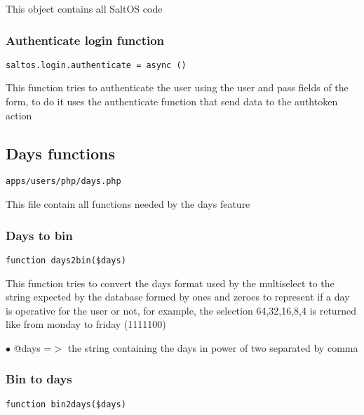 \documentclass[a4paper]{article}
\begin{document}
This object contains all SaltOS code

\hypertarget{toc167}{}
\subsubsection{Authenticate login function}

\begin{lstlisting}
saltos.login.authenticate = async ()
\end{lstlisting}

This function tries to authenticate the user using the user and pass fields of the form, to do
it uses the authenticate function that send data to the authtoken action

\hypertarget{toc168}{}
\subsection{Days functions}

\begin{lstlisting}
apps/users/php/days.php
\end{lstlisting}

This file contain all functions needed by the days feature

\hypertarget{toc169}{}
\subsubsection{Days to bin}

\begin{lstlisting}
function days2bin($days)
\end{lstlisting}

This function tries to convert the days format used by the multiselect
to the string expected by the database formed by ones and zeroes to
represent if a day is operative for the user or not, for example, the
selection 64,32,16,8,4 is returned like from monday to friday (1111100)

\begin{compactitem}
\item[\color{myblue}$\bullet$] @days =$>$ the string containing the days in power of two separated by comma
\end{compactitem}

\hypertarget{toc170}{}
\subsubsection{Bin to days}

\begin{lstlisting}
function bin2days($days)
\end{lstlisting}
\end{document}
